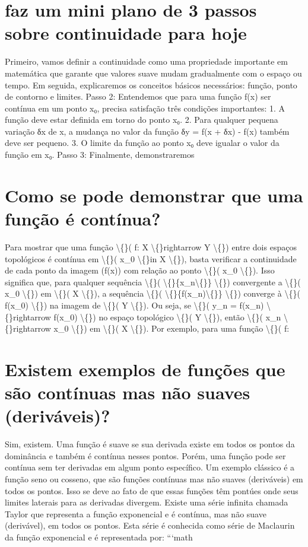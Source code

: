\documentclass[11pt,a4paper]{article}
\begin{document}
\section{faz um mini plano de 3 passos sobre continuidade para hoje}
Primeiro, vamos definir a continuidade como uma propriedade importante em matemática que garante que valores suave mudam gradualmente com o espaço ou tempo. Em seguida, explicaremos os conceitos básicos necessários: função, ponto de contorno e limites. Passo 2: Entendemos que para uma função f(x) ser contínua em um ponto x₀, precisa satisfação três condições importantes: 1. A função deve estar definida em torno do ponto x₀. 2. Para qualquer pequena variação δx de x, a mudança no valor da função δy = f(x + δx) - f(x) também deve ser pequeno. 3. O limite da função ao ponto x₀ deve igualar o valor da função em x₀. Passo 3: Finalmente, demonstraremos

\section{Como se pode demonstrar que uma função é contínua?}
Para mostrar que uma função \textbackslash\{\}( f: X \textbackslash\{\}rightarrow Y \textbackslash\{\}) entre dois espaços topológicos é contínua em \textbackslash\{\}( x\_0 \textbackslash\{\}in X \textbackslash\{\}), basta verificar a continuidade de cada ponto da imagem (f(x)) com relação ao ponto \textbackslash\{\}( x\_0 \textbackslash\{\}). Isso significa que, para qualquer sequência \textbackslash\{\}( \textbackslash\{\}\{x\_n\textbackslash\{\}\} \textbackslash\{\}) convergente a \textbackslash\{\}( x\_0 \textbackslash\{\}) em \textbackslash\{\}( X \textbackslash\{\}), a sequência \textbackslash\{\}( \textbackslash\{\}\{f(x\_n)\textbackslash\{\}\} \textbackslash\{\}) converge à \textbackslash\{\}( f(x\_0) \textbackslash\{\}) na imagem de \textbackslash\{\}( Y \textbackslash\{\}). Ou seja, se \textbackslash\{\}( y\_n = f(x\_n) \textbackslash\{\}rightarrow f(x\_0) \textbackslash\{\}) no espaço topológico \textbackslash\{\}( Y \textbackslash\{\}), então \textbackslash\{\}( x\_n \textbackslash\{\}rightarrow x\_0 \textbackslash\{\}) em \textbackslash\{\}( X \textbackslash\{\}). Por exemplo, para uma função \textbackslash\{\}( f:

\section{Existem exemplos de funções que são contínuas mas não suaves (deriváveis)?}
Sim, existem. Uma função é suave se sua derivada existe em todos os pontos da dominância e também é contínua nesses pontos. Porém, uma função pode ser contínua sem ter derivadas em algum ponto específico. Um exemplo clássico é a função seno ou cosseno, que são funções contínuas mas não suaves (deriváveis) em todos os pontos. Isso se deve ao fato de que essas funções têm pontúes onde seus limites laterais para as derivadas divergem. Existe uma série infinita chamada Taylor que representa a função exponencial e é contínua, mas não suave (derivável), em todos os pontos. Esta série é conhecida como série de Maclaurin da função exponencial e é representada por: ```math
\end{document}
